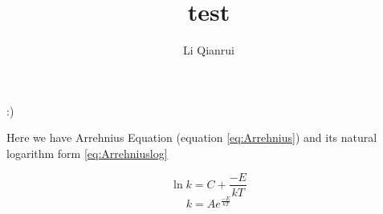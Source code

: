 \documentclass{article}
\title{test}
\author{Li Qianrui}
\begin{document}
\maketitle
:) 

Here we have Arrehnius Equation (equation \ref{eq:Arrehnius}) and its natural logarithm form \ref{eq:Arrehniuslog}

\begin{equation}
    \ln{k} = C+\frac{-E}{kT}
    \label{eq:Arrehniuslog}
\end{equation}
\begin{equation}
    k = Ae^{\frac{-E}{kT}}
    \label{eq:Arrehnius}
\end{equation}
\end{document}
